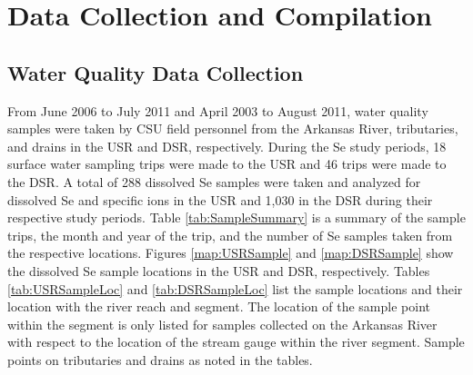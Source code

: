 
\renewcommand{\thechapter}{3}
\chapter{Data Collection and Compilation}
\label{chap:data collection}

\begin{linenumbers}
\section{Water Quality Data Collection}
\label{sec:field data collection}

From June 2006 to July 2011 and April 2003 to August 2011, water quality samples were taken by CSU field personnel from the Arkansas River, tributaries, and drains in the USR and DSR, respectively.   During the Se study periods, 18 surface water sampling trips were made to the USR and 46 trips were made to the DSR.  A total of 288 dissolved Se samples were taken and analyzed for dissolved Se and specific ions in the USR and 1,030 in the DSR during their respective study periods.  Table \ref{tab:SampleSummary} is a summary of the sample trips, the month and year of the trip, and the number of Se samples taken from the respective locations.  Figures \ref{map:USRSample} and \ref{map:DSRSample} show the dissolved Se sample locations in the USR and DSR, respectively.  Tables \ref{tab:USRSampleLoc} and \ref{tab:DSRSampleLoc} list the sample locations and their location with the river reach and segment.  The location of the sample point within the segment is only listed for samples collected on the Arkansas River with respect to the location of the stream gauge within the river segment.  Sample points on tributaries and drains as noted in the tables.


\end{linenumbers}
